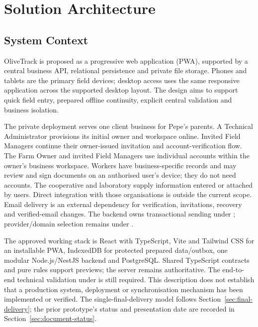 \section{Solution Architecture}
\label{sec:solution-architecture}

\subsection{System Context}
OliveTrack is proposed as a progressive web application (PWA), supported by a
central business API, relational persistence and private file storage. Phones and
tablets are the primary field devices; desktop access uses the same responsive
application across the supported desktop layout. The design aims to support quick field entry,
prepared offline continuity, explicit central validation and business isolation.

The private deployment serves one client business for Pepe's parents. A Technical
Administrator provisions its initial owner and workspace online. Invited Field
Managers continue their owner-issued invitation and account-verification flow.
The Farm Owner and invited Field Managers use individual accounts within the
owner's business workspace. Workers have business-specific records and may review
and sign documents on an authorised user's device; they do not need accounts.
The cooperative and laboratory supply information entered or attached by users.
Direct integration with those organisations is outside the current scope.
Email delivery is an external dependency for verification, invitations,
recovery and verified-email changes. The backend owns transactional sending under
; provider/domain selection remains under .

The approved working stack is React with TypeScript, Vite and Tailwind CSS for an
installable PWA, IndexedDB for protected prepared data/outbox, one modular
Node.js/NestJS backend and PostgreSQL. Shared TypeScript contracts and pure rules
support previews; the server remains authoritative. The end-to-end technical validation
under  is still required. This description does not establish that a production
system, deployment or synchronisation mechanism has been implemented or verified.
The single-final-delivery model follows Section~\ref{sec:final-delivery}; the prior prototype's status and
presentation date are recorded in Section~\ref{sec:document-status}.

